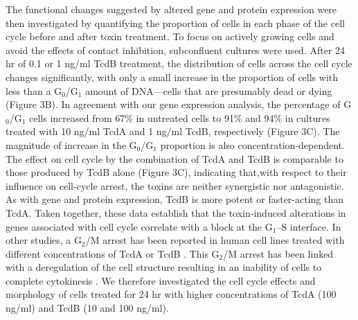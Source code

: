 The functional changes suggested by altered gene and protein expression were then investigated by quantifying the proportion of cells in each phase of the cell cycle before and after toxin treatment. To focus on actively growing cells and avoid the effects of contact inhibition, subconfluent cultures were used. After 24 hr of 0.1 or 1 ng/ml TcdB treatment, the distribution of cells across the cell cycle changes significantly, with only a small increase in the proportion of cells with less than a G$_{\text{0}}$/G$_{\text{1}}$ amount of DNA—cells that are presumably dead or dying (Figure 3B). In agreement with our gene expression analysis, the percentage of G$_{\text{0}}$/G$_{\text{1}}$ cells increased from 67\% in untreated cells to 91\% and 94\% in cultures treated with 10 ng/ml TcdA and 1 ng/ml TcdB, respectively (Figure 3C). The magnitude of increase in the G$_{\text{0}}$/G$_{\text{1}}$ proportion is also concentration-dependent. The effect on cell cycle by the combination of TcdA and TcdB is comparable to those produced by TcdB alone (Figure 3C), indicating that,with respect to their influence on cell-cycle arrest, the toxins are neither synergistic nor antagonistic. As with gene and protein expression, TcdB is more potent or faster-acting than TcdA. Taken together, these data establish that the toxin-induced alterations in genes associated with cell cycle correlate with a block at the G$_{\text{1}}$–S interface. In other studies, a G$_{\text{2}}$/M arrest has been reported in human cell lines treated with different concentrations of TcdA or TcdB \cite{Kim:2005jk, Gerhard:2008wz, Nottrott:2007ep}. This G$_{\text{2}}$/M arrest has been linked with a deregulation of the cell structure resulting in an inability of cells to complete cytokinesis \cite{Huelsenbeck:2009di}. We therefore investigated the cell cycle effects and morphology of cells treated for 24 hr with higher concentrations of TcdA (100 ng/ml) and TcdB (10 and 100 ng/ml).


